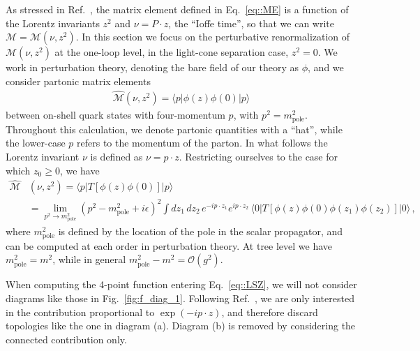 As stressed in Ref.~\cite{Radyushkin:2017cyf}, the matrix element defined in
Eq.~\eqref{eq::ME} is a function of the Lorentz invariants $z^2$ and $\nu =
P\cdot z$, the ``Ioffe time'', so that we can write
$\mathcal{M}=\mathcal{M}\left(\nu,z^2\right)$. In this section we focus on the
perturbative renormalization of $\mathcal{M}\left(\nu,z^2\right)$ at the
one-loop level, in the light-cone separation case, $z^2=0$. 
%
We work in perturbation theory, denoting the bare field of our theory as $\phi$,
and we consider partonic matrix elements
\begin{align}
\label{eq::MEpartonic}
        \widehat{\mathcal{M}}\left(\nu,z^2\right) = \langle p | \phi\left(z\right)\phi\left(0\right)  | p \rangle
\end{align}
between on-shell quark states with four-momentum $p$, with $p^2 =
m_\mathrm{pole}^2$. Throughout this calculation, we denote partonic quantities
with a ``hat'', while the lower-case $p$ refers to the momentum of the parton.
In what follows the Lorentz invariant $\nu$ is defined as $\nu=p\cdot z$.
Restricting ourselves to the case for which $z_0 \geqslant 0 $, we have
\begin{align}
\label{eq::LSZ}
        \widehat{\mathcal{M}}&\left(\nu, z^2\right)=\langle p |T\left[\phi\left(z\right)\phi\left(0\right)\right]|p\rangle  \nonumber \\
        & = \lim_{p^2\rightarrow m^2_{\text{pole}}}\left(p^2-m^2_{\text{pole}} + i\epsilon\right)^2 
        \int dz_1\,dz_2 \,e^{-ip\cdot z_1}e^{ip\cdot z_2}\,
        \langle 0 | T\left[\phi\left(z\right)\phi\left(0\right)\phi\left(z_1\right)\phi\left(z_2\right)\right]|0\rangle\, ,
\end{align}
where $m_\mathrm{pole}^2$ is defined by the location of the pole in the scalar
propagator, and can be computed at each order in perturbation theory. At tree
level we have $m_\mathrm{pole}^2 = m^2$, while in general $m_\mathrm{pole}^2 - m^2 = \mathcal{O}\left(g^2\right)$.

When computing the 4-point function entering Eq.~\eqref{eq::LSZ}, we will not
consider diagrams like those in Fig.~\ref{fig:f_diag_1}. Following
Ref.~\cite{Collins:1980ui}, we are only interested in the contribution
proportional to $\exp(-ip\cdot z)$, and therefore discard topologies like the
one in diagram (a). Diagram (b) is removed by considering the connected
contribution only. 

\setlength{\feynhanddotsize}{1.3truemm}

